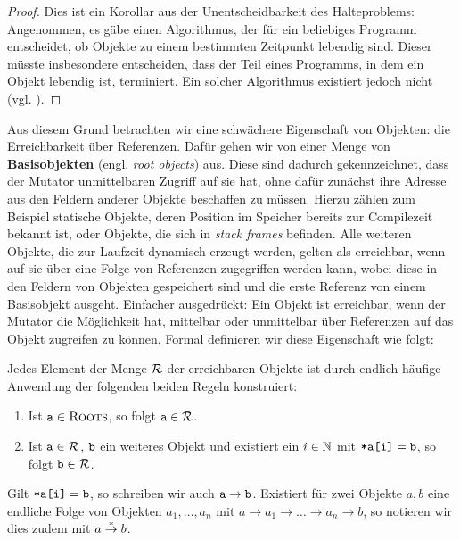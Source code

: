 \begin{proof}
	Dies ist ein Korollar aus der Unentscheidbarkeit des Halteproblems:
	Angenommen, es gäbe einen Algorithmus, der für ein beliebiges Programm entscheidet, ob Objekte zu einem bestimmten Zeitpunkt lebendig sind.
	Dieser müsste insbesondere entscheiden, dass der Teil eines Programms, in dem ein Objekt lebendig ist, terminiert.
	Ein solcher Algorithmus existiert jedoch nicht (vgl. \cite[Kap. 4.2]{sipser}).
\end{proof}

Aus diesem Grund betrachten wir eine schwächere Eigenschaft von Objekten: die Erreichbarkeit über Referenzen.
Dafür gehen wir von einer Menge \Roots von \textbf{Basisobjekten} (engl. \textit{root objects}) aus.
Diese sind dadurch gekennzeichnet, dass der Mutator unmittelbaren Zugriff auf sie hat, ohne dafür zunächst ihre Adresse aus den Feldern anderer Objekte beschaffen zu müssen.
Hierzu zählen zum Beispiel statische Objekte, deren Position im Speicher bereits zur Compilezeit bekannt ist, oder Objekte, die sich in \textit{stack frames} befinden.
Alle weiteren Objekte, die zur Laufzeit dynamisch erzeugt werden, gelten als erreichbar, wenn auf sie über eine Folge von Referenzen zugegriffen werden kann, wobei diese in den Feldern von Objekten gespeichert sind und die erste Referenz von einem Basisobjekt ausgeht.
Einfacher ausgedrückt: Ein Objekt ist erreichbar, wenn der Mutator die Möglichkeit hat, mittelbar oder unmittelbar über Referenzen auf das Objekt zugreifen zu können.
Formal definieren wir diese Eigenschaft wie folgt:

\begin{mybox}
\begin{defn}[Erreichbarkeit]
	\label{def:erreichbar}
	Jedes Element der Menge $\mathcal{R}$ der erreichbaren Objekte ist durch endlich häufige Anwendung der folgenden beiden Regeln konstruiert:
	\begin{enumerate}[(1)]
		\item Ist $\texttt{a} \in \textsc{Roots}$, so folgt $\texttt{a} \in \mathcal{R}$.
		\item Ist $\texttt{a} \in \mathcal{R}$, $\texttt{b}$ ein weiteres Objekt und existiert ein $i \in \mathbb{N}$ mit $\texttt{*a[i]} = \texttt{b}$, so folgt $\texttt{b} \in \mathcal{R}$.
	\end{enumerate}
	Gilt $\texttt{*a[i]} = \texttt{b}$, so schreiben wir auch $\texttt{a} \rightarrow \texttt{b}$.
	Existiert für zwei Objekte $a,b$ eine endliche Folge von Objekten $a_1, \dots, a_n$ mit $a \rightarrow a_1 \rightarrow \dots \rightarrow a_n \rightarrow b$, so notieren wir dies zudem mit $a \overset{*}{\rightarrow} b$.
\end{defn}
\end{mybox}

